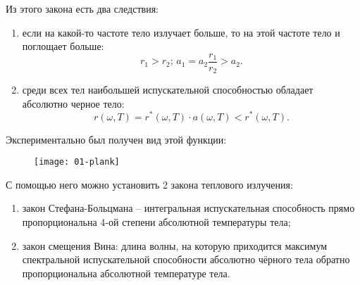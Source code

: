 Из этого закона есть два следствия:
\begin{enumerate}
    \item если на какой-то частоте тело излучает больше, то на этой частоте тело
        и поглощает больше:
        \[
            r_1 > r_2;\, a_1 = a_2\frac{r_1}{r_2} > a_2.
        \]
    \item среди всех тел наибольшей испускательной способностью обладает
        абсолютно черное тело:
        \[
            r(\omega, T) = r^*(\omega, T)\cdot a(\omega, T) < r^*(\omega, T).
        \]
\end{enumerate}

Экспериментально был получен вид этой функции:
\begin{figure}[h!]
    \center
    \texttt{[image: 01-plank]}
\end{figure}

С помощью него можно установить 2 закона теплового излучения:
\begin{enumerate}
    \item закон Стефана-Больцмана -- интегральная испускательная способность
        прямо пропорциональна 4-ой степени абсолютной температуры тела;
    \item закон смещения Вина: длина волны, на которую приходится максимум
        спектральной испускательной способности абсолютно чёрного тела обратно
        пропорциональна абсолютной температуре тела.
\end{enumerate}

